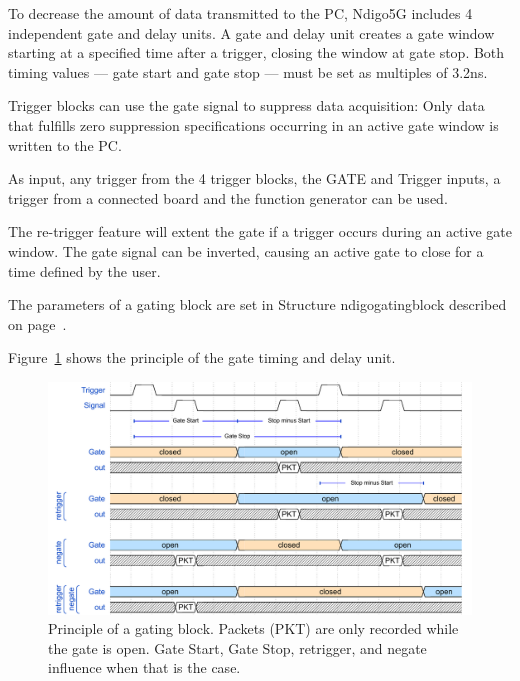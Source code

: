         To decrease the amount of data transmitted to the PC, Ndigo5G includes 4 independent gate and delay units. A gate and delay unit creates a gate window starting at a specified time after a trigger, closing the window at gate stop. Both timing values — gate start and gate stop — must be set as multiples of 3.2ns.\par

        Trigger blocks can use the gate signal to suppress data acquisition: Only data that fulfills zero suppression specifications occurring in an active gate window is written to the PC.\par
        As input, any trigger from the 4 trigger blocks, the GATE and Trigger inputs, a trigger from a connected board and the function generator can be used.\par

        The re-trigger feature will extent the gate if a trigger occurs during an active gate window. The gate signal can be inverted, causing an active gate to close for a time defined by the user.\par

        The parameters of a gating block are set in Structure \textsf{ndigo\tu gating\tu block} described on page~\pageref{cp:gatingblock}.\par

        Figure~\ref{fig:GateUDelay} shows the principle of the gate timing and delay unit.

        \begin{figure}[ht]
            \begin{center}
                \includegraphics[width=1.0\textwidth]{figures/gating_principle.pdf}
                \caption{\label{fig:GateUDelay} Principle of a gating block. Packets (PKT) are only recorded while the gate is open. Gate Start, Gate Stop, retrigger, and negate influence when that is the case.}
            \end{center}
        \end{figure}

